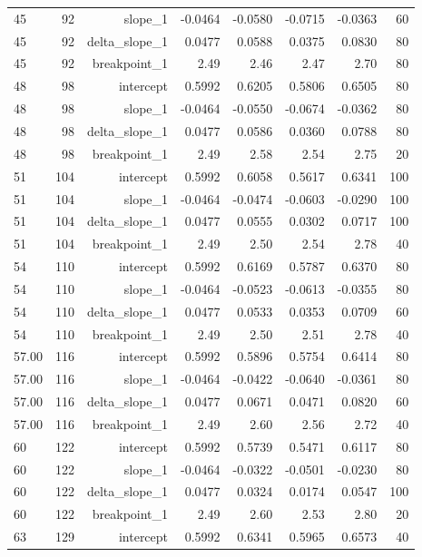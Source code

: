 {\begin{longtable}{lrrrrrrr}
  45 & 92 & slope\_1 & -0.0464 & -0.0580 & -0.0715 & -0.0363 & 60 \\
  45 & 92 & delta\_slope\_1 & 0.0477 & 0.0588 & 0.0375 & 0.0830 & 80 \\
  45 & 92 & breakpoint\_1 & 2.49 & 2.46 & 2.47 & 2.70 & 80 \\
  48 & 98 & intercept & 0.5992 & 0.6205 & 0.5806 & 0.6505 & 80 \\
  48 & 98 & slope\_1 & -0.0464 & -0.0550 & -0.0674 & -0.0362 & 80 \\
  48 & 98 & delta\_slope\_1 & 0.0477 & 0.0586 & 0.0360 & 0.0788 & 80 \\
  48 & 98 & breakpoint\_1 & 2.49 & 2.58 & 2.54 & 2.75 & 20 \\
  51 & 104 & intercept & 0.5992 & 0.6058 & 0.5617 & 0.6341 & 100 \\
  51 & 104 & slope\_1 & -0.0464 & -0.0474 & -0.0603 & -0.0290 & 100 \\
  51 & 104 & delta\_slope\_1 & 0.0477 & 0.0555 & 0.0302 & 0.0717 & 100 \\
  51 & 104 & breakpoint\_1 & 2.49 & 2.50 & 2.54 & 2.78 & 40 \\
  54 & 110 & intercept & 0.5992 & 0.6169 & 0.5787 & 0.6370 & 80 \\
  54 & 110 & slope\_1 & -0.0464 & -0.0523 & -0.0613 & -0.0355 & 80 \\
  54 & 110 & delta\_slope\_1 & 0.0477 & 0.0533 & 0.0353 & 0.0709 & 60 \\
  54 & 110 & breakpoint\_1 & 2.49 & 2.50 & 2.51 & 2.78 & 40 \\
  57.00 & 116 & intercept & 0.5992 & 0.5896 & 0.5754 & 0.6414 & 80 \\
  57.00 & 116 & slope\_1 & -0.0464 & -0.0422 & -0.0640 & -0.0361 & 80 \\
  57.00 & 116 & delta\_slope\_1 & 0.0477 & 0.0671 & 0.0471 & 0.0820 & 60 \\
  57.00 & 116 & breakpoint\_1 & 2.49 & 2.60 & 2.56 & 2.72 & 40 \\
  60 & 122 & intercept & 0.5992 & 0.5739 & 0.5471 & 0.6117 & 80 \\
  60 & 122 & slope\_1 & -0.0464 & -0.0322 & -0.0501 & -0.0230 & 80 \\
  60 & 122 & delta\_slope\_1 & 0.0477 & 0.0324 & 0.0174 & 0.0547 & 100 \\
  60 & 122 & breakpoint\_1 & 2.49 & 2.60 & 2.53 & 2.80 & 20 \\
  63 & 129 & intercept & 0.5992 & 0.6341 & 0.5965 & 0.6573 & 40 \\

\end{longtable}}
